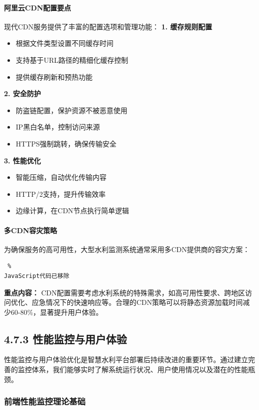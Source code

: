 \paragraph{阿里云CDN配置要点}\label{ux963fux91ccux4e91cdnux914dux7f6eux8981ux70b9} 现代CDN服务提供了丰富的配置选项和管理功能： \textbf{1. 缓存规则配置}
\begin{itemize} \tightlist \item 根据文件类型设置不同缓存时间 \item 支持基于URL路径的精细化缓存控制 \item 提供缓存刷新和预热功能 \end{itemize} \textbf{2. 安全防护}
\begin{itemize} \tightlist \item 防盗链配置，保护资源不被恶意使用 \item IP黑白名单，控制访问来源 \item HTTPS强制跳转，确保传输安全 \end{itemize} \textbf{3.
性能优化} \begin{itemize} \tightlist \item 智能压缩，自动优化传输内容 \item HTTP/2支持，提升传输效率 \item 边缘计算，在CDN节点执行简单逻辑 \end{itemize}
\paragraph{多CDN容灾策略}\label{ux591acdnux5bb9ux707eux7b56ux7565} 为确保服务的高可用性，大型水利监测系统通常采用多CDN提供商的容灾方案： \begin{lstlisting} %
JavaScript代码已移除 \end{lstlisting} \textbf{重点内容：}
CDN配置需要考虑水利系统的特殊需求，如高可用性要求、跨地区访问优化、应急情况下的快速响应等。合理的CDN策略可以将静态资源加载时间减少60-80\%，显著提升用户体验。 \subsection{4.7.3
性能监控与用户体验}\label{ux6027ux80fdux76d1ux63a7ux4e0eux7528ux6237ux4f53ux9a8c}
性能监控与用户体验优化是智慧水利平台部署后持续改进的重要环节。通过建立完善的监控体系，我们能够实时了解系统运行状况、用户使用情况以及潜在的性能瓶颈。
\subsubsection{前端性能监控理论基础}\label{ux524dux7aefux6027ux80fdux76d1ux63a7ux7406ux8bbaux57faux7840}
